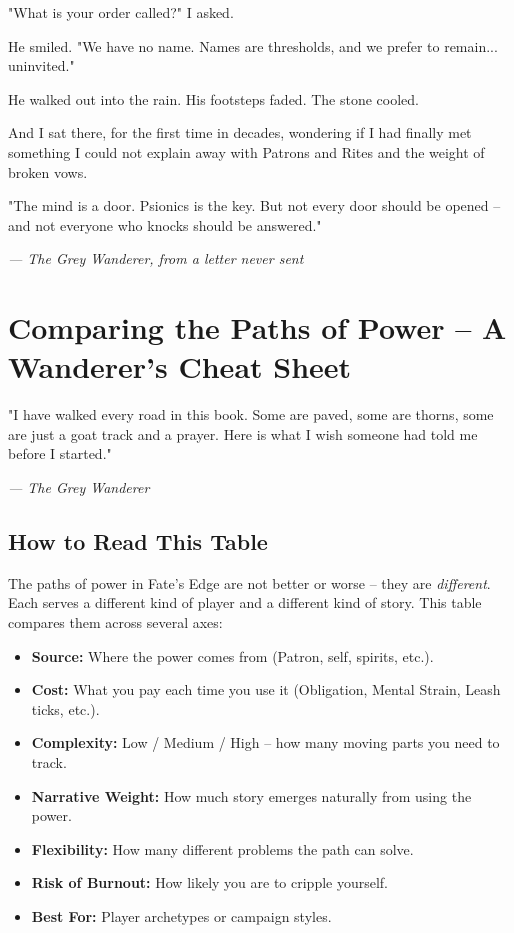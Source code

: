 \documentclass[10pt,a5paper]{book}
\begin{document}
"What is your order called?" I asked.

He smiled. "We have no name. Names are thresholds, and we prefer to remain... uninvited."

He walked out into the rain. His footsteps faded. The stone cooled.

And I sat there, for the first time in decades, wondering if I had finally met something I could not explain away with Patrons and Rites and the weight of broken vows.

\epigraph{"The mind is a door. Psionics is the key. But not every door should be opened -- and not everyone who knocks should be answered."}{\textit{--- The Grey Wanderer, from a letter never sent}}

\appendix
{}

\chapter{Comparing the Paths of Power -- A Wanderer's Cheat Sheet}

\epigraph{"I have walked every road in this book. Some are paved, some are thorns, some are just a goat track and a prayer. Here is what I wish someone had told me before I started."}{\textit{--- The Grey Wanderer}}

\section*{How to Read This Table}

The paths of power in Fate's Edge are not better or worse -- they are \textit{different}. Each serves a different kind of player and a different kind of story. This table compares them across several axes:

\begin{itemize}
    \item \textbf{Source:} Where the power comes from (Patron, self, spirits, etc.).
    \item \textbf{Cost:} What you pay each time you use it (Obligation, Mental Strain, Leash ticks, etc.).
    \item \textbf{Complexity:} Low / Medium / High -- how many moving parts you need to track.
    \item \textbf{Narrative Weight:} How much story emerges naturally from using the power.
    \item \textbf{Flexibility:} How many different problems the path can solve.
    \item \textbf{Risk of Burnout:} How likely you are to cripple yourself.
    \item \textbf{Best For:} Player archetypes or campaign styles.
\end{itemize}
\end{document}
